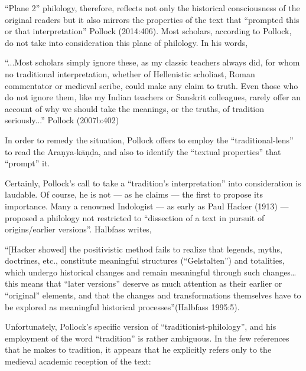 “Plane 2” philology, therefore, reflects not only the historical consciousness of the original readers but it also mirrors the properties of the text that “prompted this or that interpretation” Pollock (2014:406). Most scholars, according to Pollock, do not take into consideration this plane of philology. In his words,

\newpage

\begin{myquote} 
“...Most scholars simply ignore these, as my classic teachers always did, for whom no traditional interpretation, whether of Hellenistic scholiast, Roman commentator or medieval scribe, could make any claim to truth. Even those who do not ignore them, like my Indian teachers or Sanskrit colleagues, rarely offer an account of why we should take the meanings, or the truths, of tradition seriously...”
\hfill Pollock (2007b:402)
\end{myquote}

In order to remedy the situation, Pollock offers to employ the “traditional-lens” to read the Araṇya-kāṇḍa, and also to identify the “textual properties” that “prompt” it.  
	
Certainly, Pollock’s call to take a “tradition’s interpretation” into consideration is laudable. Of course, he is not --- as he claims --- the first to propose its importance. Many a renowned Indologist --- as early as Paul Hacker (1913) --- proposed a philology not restricted to “dissection of a text in pursuit of origins/earlier versions”. Halbfass writes, 

\begin{myquote}
“[Hacker showed] the positivistic method fails to realize that legends, myths, doctrines, etc., constitute meaningful structures (“Gelstalten”) and totalities, which undergo historical changes and remain meaningful through such changes… this means that “later versions” deserve as much attention as their earlier or “original” elements, and that the changes and transformations themselves have to be explored as meaningful historical processes”\hfill (Halbfass 1995:5). 
\end{myquote}

Unfortunately, Pollock’s specific version of “traditionist-philology”, and his employment of the word “tradition” is rather ambiguous. In the few references that he makes to tradition, it appears that he explicitly refers only to the medieval academic reception of the text: 

